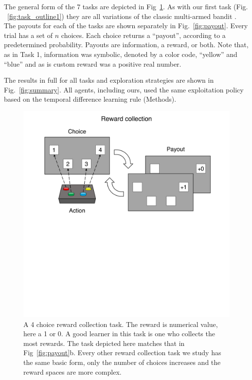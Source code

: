 The general form of the 7 tasks are depicted in Fig~\ref{fig:task_outline2}. As with our first task (Fig. ~\ref{fig:task_outline1}) they are all variations of the classic multi-armed bandit \citep{Sutton2018}. The payouts for each of the tasks are shown separately in Fig.~\ref{fig:payout}. Every trial has a set of $n$ choices. Each choice returns a “payout”, according to a predetermined probability. Payouts are information, a reward, or both. Note that, as in Task 1, information was symbolic, denoted by a color code, “yellow” and “blue” and as is custom reward was a positive real number. 

The results in full for all tasks and exploration strategies are shown in Fig.~\ref{fig:summary}. All agents, including ours, used the same exploitation policy based on the temporal difference learning rule \citep{Sutton2018} (Methods).

\begin{figure}
	\begin{fullwidth}
	\includegraphics[width=1.0\linewidth]{img/task_outline2.pdf} 
	\caption{A 4 choice reward collection task. The reward is numerical value, here a 1 or 0. A good learner in this task is one who collects the most rewards. The task depicted here matches that in Fig~\ref{fig:payout}b. Every other reward collection task we study has the same basic form, only the number of choices increases and the reward spaces are more complex.}
	\label{fig:task_outline2} 
	\end{fullwidth}
\end{figure}

